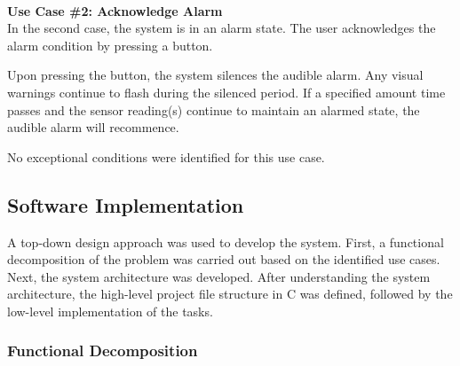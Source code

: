 \documentclass[12pt]{article} %
\begin{document}
~\\
\textbf{Use Case \#2: Acknowledge Alarm} \\
In the second case, the system is in an alarm state. The user acknowledges
the alarm condition by pressing a button.

Upon pressing the button, the system silences the audible alarm. Any visual warnings continue to flash during the silenced period. If a specified amount 
time passes and the sensor reading(s) continue to maintain an alarmed state,
the audible alarm will recommence.

No exceptional conditions were identified for this use case.\\


\subsection{Software Implementation}

A top-down design approach was used to develop the system.  First, a functional decomposition of the problem was carried out based on the identified use cases.  Next, the system architecture was developed.  After understanding the system architecture, the high-level project file structure in C was defined, followed by the low-level implementation of the tasks.

\subsubsection{Functional Decomposition}

\end{document}
